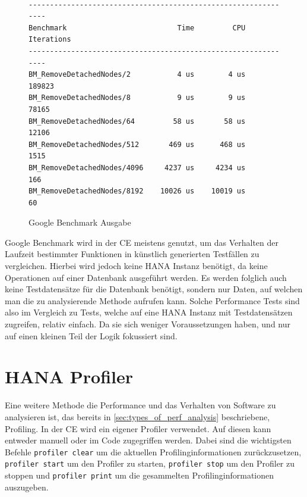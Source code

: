 \begin{figure}[h]
    \begin{center}
        \begin{verbatim}

---------------------------------------------------------------
Benchmark                          Time         CPU Iterations 
---------------------------------------------------------------
BM_RemoveDetachedNodes/2           4 us        4 us     189823 
BM_RemoveDetachedNodes/8           9 us        9 us      78165 
BM_RemoveDetachedNodes/64         58 us       58 us      12106 
BM_RemoveDetachedNodes/512       469 us      468 us       1515 
BM_RemoveDetachedNodes/4096     4237 us     4234 us        166 
BM_RemoveDetachedNodes/8192    10026 us    10019 us         60 
        \end{verbatim}
    \end{center}
    \caption{Google Benchmark Ausgabe}\label{fig:google_benchmark_ausgabe}
\end{figure}

Google Benchmark wird in der \ac{CE} meistens genutzt, um das Verhalten der
Laufzeit bestimmter Funktionen in künstlich generierten Testfällen zu
vergleichen. Hierbei wird jedoch keine HANA Instanz benötigt, da
keine Operationen auf einer Datenbank ausgeführt werden. Es werden folglich
auch keine Testdatensätze für die Datenbank benötigt, sondern nur Daten, auf
welchen man die zu analysierende Methode aufrufen kann. Solche Performance
Tests sind also im Vergleich zu Tests, welche auf eine HANA Instanz mit
Testdatensätzen zugreifen, relativ einfach. Da sie sich weniger Voraussetzungen
haben, und nur auf einen kleinen Teil der Logik fokussiert sind.

\section{HANA Profiler}
\label{sec:hana_profiler}


Eine weitere Methode die Performance und das Verhalten von Software zu
analysieren ist, das bereits in \autoref{sec:types_of_perf_analysis}
beschriebene, Profiling. In der \ac{CE} wird ein eigener Profiler verwendet.
Auf diesen kann entweder manuell oder im Code zugegriffen werden. Dabei sind
die wichtigsten Befehle \texttt{profiler clear} um die aktuellen
Profilinginformationen zurückzusetzen,  \texttt{profiler start} um den Profiler
zu starten, \texttt{profiler stop} um den Profiler zu stoppen und
\texttt{profiler print} um die gesammelten Profilinginformationen auszugeben.

